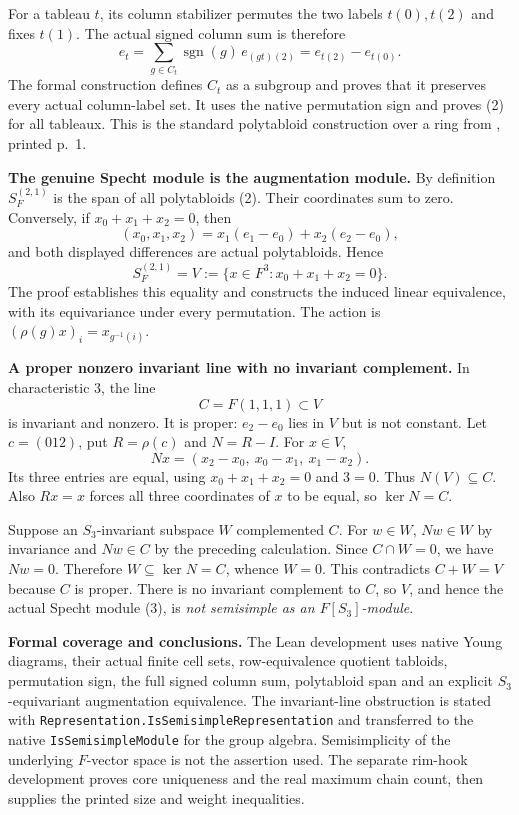 \documentclass[10pt,a4paper]{article}
\begin{document}
For a tableau $t$, its column stabilizer permutes the two labels $t(0),t(2)$
and fixes $t(1)$. The actual signed column sum is therefore
\[
 e_t=\sum_{g\in C_t}\operatorname{sgn}(g)\,e_{(gt)(2)}
     =e_{t(2)}-e_{t(0)}. \tag{2}
\]
The formal construction defines $C_t$ as a subgroup and proves that it
preserves every actual column-label set. It uses the native permutation sign
and proves (2) for all tableaux. This is the standard polytabloid construction
over a ring from \cite{specht}, printed p.~1.

\newpage
\textbf{The genuine Specht module is the augmentation module.}
By definition $S^{(2,1)}_F$ is the span of all polytabloids (2).
Their coordinates sum to zero. Conversely, if $x_0+x_1+x_2=0$, then
\[
 (x_0,x_1,x_2)=x_1(e_1-e_0)+x_2(e_2-e_0),
\]
and both displayed differences are actual polytabloids. Hence
\[
 S^{(2,1)}_F=V:=\{x\in F^3:x_0+x_1+x_2=0\}. \tag{3}
\]
The proof establishes this equality and constructs the induced linear
equivalence, with its equivariance under every permutation. The action is
$(\rho(g)x)_i=x_{g^{-1}(i)}$.

\textbf{A proper nonzero invariant line with no invariant complement.}
In characteristic $3$, the line
\[
 C=F(1,1,1)\subset V
\]
is invariant and nonzero. It is proper: $e_2-e_0$ lies in $V$ but is not
constant. Let $c=(012)$, put $R=\rho(c)$ and $N=R-I$.
For $x\in V$,
\[
 Nx=(x_2-x_0,\ x_0-x_1,\ x_1-x_2).
\]
Its three entries are equal, using $x_0+x_1+x_2=0$ and $3=0$.
Thus $N(V)\subseteq C$. Also $Rx=x$ forces all three coordinates of $x$
to be equal, so $\ker N=C$.

Suppose an $S_3$-invariant subspace $W$ complemented $C$. For $w\in W$,
$Nw\in W$ by invariance and $Nw\in C$ by the preceding calculation.
Since $C\cap W=0$, we have $Nw=0$. Therefore $W\subseteq\ker N=C$, whence
$W=0$. This contradicts $C+W=V$ because $C$ is proper. There is no invariant
complement to $C$, so $V$, and hence the actual Specht module (3), is
\emph{not semisimple as an $F[S_3]$-module}.

\textbf{Formal coverage and conclusions.}
The Lean development uses native Young diagrams, their actual finite cell sets,
row-equivalence quotient tabloids, permutation sign, the full signed column sum,
polytabloid span and an explicit $S_3$-equivariant augmentation equivalence.
The invariant-line obstruction is stated with
\texttt{Representation.IsSemisimpleRepresentation} and transferred to the
native \texttt{IsSemisimpleModule} for the group algebra.
Semisimplicity of the underlying $F$-vector space is not the assertion used.
The separate rim-hook development proves core uniqueness and the real maximum
chain count, then supplies the printed size and weight inequalities.
\end{document}
